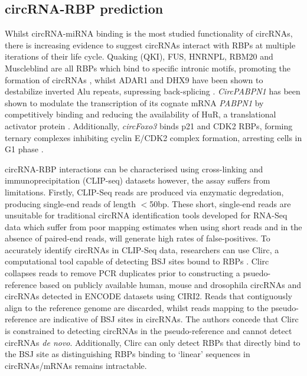 \documentclass[pdflatex,sn-mathphys-num]{sn-jnl}
\begin{document}
\subsection*{circRNA-RBP prediction}
Whilst circRNA-miRNA binding is the most studied functionality of circRNAs, there is increasing evidence to suggest circRNAs interact with RBPs at multiple iterations of their life cycle. Quaking (QKI), FUS, HNRNPL, RBM20 and Muscleblind are all RBPs which bind to specific intronic motifs, promoting the formation of circRNAs \cite{Ashwal-Fluss2014Oct, Conn2015Mar, Errichelli2017Mar, Fei2017Jun, Khan2016Oct}, whilst ADAR1 and DHX9 have been shown to destabilize inverted Alu repeats, supressing back-splicing \cite{Ivanov2015Jan, Aktas2017Apr}. \textit{CircPABPN1} has been shown to modulate the transcription of its cognate mRNA \textit{PABPN1} by competitively binding and reducing the availability of HuR, a translational activator protein \cite{Abdelmohsen2017Feb}. Additionally, \textit{circFoxo3} binds p21 and CDK2 RBPs, forming ternary complexes inhibiting cyclin E/CDK2 complex formation, arresting cells in G1 phase \cite{Du2016Apr}. \par
circRNA-RBP interactions can be characterised using cross-linking and immunoprecipitation (CLIP-seq) datasets however, the assay suffers from limitations. Firstly, CLIP-Seq reads are produced via enzymatic degredation, producing single-end reads of length $<$50bp. These short, single-end reads are unsuitable for traditional circRNA identification tools developed for RNA-Seq data which suffer from poor mapping estimates when using short reads and in the absence of paired-end reads, will generate high rates of false-positives. To accurately identify circRNAs in CLIP-Seq data, researchers can use Clirc, a computational tool capable of detecting BSJ sites bound to RBPs \cite{Clirc}. Clirc collapses reads to remove PCR duplicates prior to constructing a psuedo-reference based on publicly available human, mouse and drosophila circRNAs and circRNAs detected in ENCODE datasets using CIRI2. Reads that contiguously align to the reference genome are discarded, whilst reads mapping to the pseudo-reference are indicative of BSJ sites in circRNAs. The authors concede that Clirc is constrained to detecting circRNAs in the pseudo-reference and cannot detect circRNAs \textit{de novo}. Additionally, Clirc can only detect RBPs that directly bind to the BSJ site as distinguishing RBPs binding to `linear' sequences in circRNAs/mRNAs remains intractable. \par
\end{document}
